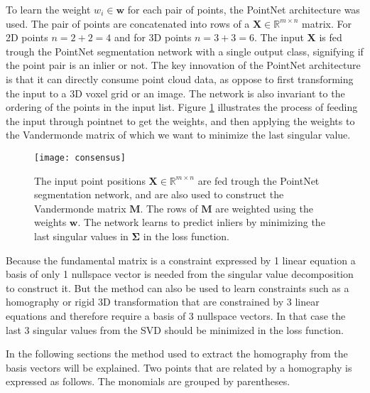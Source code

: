 To learn the weight $w_i \in \textbf{w}$ for each pair of points, the PointNet\cite{pointnet} architecture was used. The pair of points are concatenated into rows of a $\mathbf{X}\in \mathbb{R}^{m\times n} $ matrix. For 2D points $n = 2+2=4$ and for 3D points $n=3+3=6$. The input $\mathbf{X}$ is fed trough the PointNet segmentation network with a single output class, signifying if the point pair is an inlier or not. The key innovation of the PointNet architecture is that it can directly consume point cloud data, as oppose to first transforming the input to a 3D voxel grid or an image. The network is also invariant to the ordering of the points in the input list. Figure \ref{fig:consensus} illustrates the process of feeding the input through pointnet to get the weights, and then applying the weights to the Vandermonde matrix of which we want to minimize the last singular value.

\begin{figure}[H]
	\centering
	\texttt{[image: consensus]}
	\caption{The input point positions $\mathbf{X}\in \mathbb{R}^{m\times n}$ are fed trough the PointNet segmentation network, and are also used to construct the Vandermonde matrix $\mathbf{M}$. The rows of $\mathbf{M}$ are weighted using the weights $\mathbf{w}$. The network learns to predict inliers by minimizing the last singular values in $\mathbf{\Sigma}$ in the loss function.}
	\label{fig:consensus}
\end{figure}

Because the fundamental matrix is a constraint expressed by 1 linear equation a basis of only 1  nullspace vector is needed from the singular value decomposition to construct it. But the method can also be used to learn constraints such as a homography or rigid 3D transformation that are constrained by 3 linear equations and therefore require a basis of 3 nullspace vectors. In that case the last 3 singular values from the SVD should be minimized in the loss function.

In the following sections the method used to extract the homography from the basis vectors will be explained. Two points that are related by a homography is expressed as follows. The monomials are grouped by parentheses.

